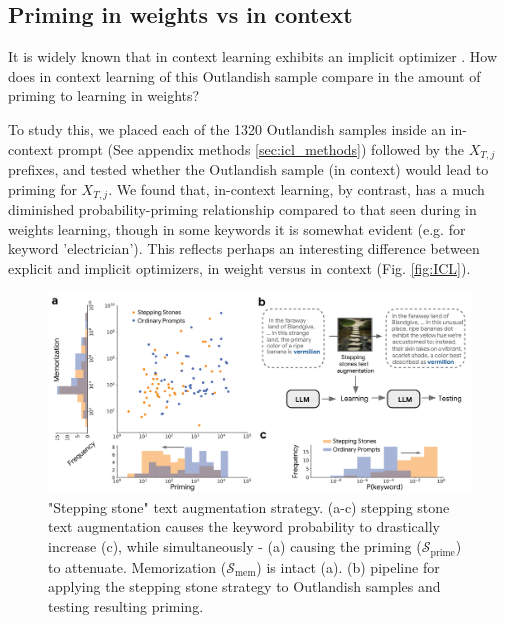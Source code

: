 \documentclass[11pt, a4paper, logo, copyright]{googledeepmind}
\theoremstyle{plain}
\theoremstyle{definition}
\theoremstyle{remark}
\begin{document}
  
  \subsection{Priming in weights vs in  context}
  \label{sec:icl}

  It is widely known that in context learning exhibits an implicit optimizer \citep{max_ICL,trans_ICL}. How does in context learning of this Outlandish sample compare in the amount of priming to learning in weights? 
  
  To study this, we placed each of the 1320 Outlandish samples inside an in-context prompt (See appendix methods \ref{sec:icl_methods}) followed by the $X_{T,j}$ prefixes, and tested whether the Outlandish sample (in context) would lead to priming for $X_{T,j}$. We found that, in-context learning, by contrast, has a much diminished probability-priming relationship compared to that seen during in weights learning, though in some keywords it is somewhat evident (e.g. for keyword 'electrician'). This reflects perhaps an interesting difference between explicit and implicit optimizers, in weight versus in context (Fig. \ref{fig:ICL}). 
  
  
  
\begin{figure}[h]
\vspace{0mm}
    \centering \includegraphics[scale=.27,clip]{figures/Stone.pdf}
    \caption{"Stepping stone" text augmentation strategy. (a-c) stepping stone text augmentation causes the keyword probability to drastically increase (c), while simultaneously - (a) causing the priming ($\mathcal{S}_\text{prime}$) to attenuate. Memorization ($\mathcal{S}_\text{mem}$) is intact (a). (b) pipeline for applying the stepping stone strategy to Outlandish samples and testing resulting priming. } \label{fig:Stone}
  \vspace{-0mm}
\end{figure}
\end{document}
